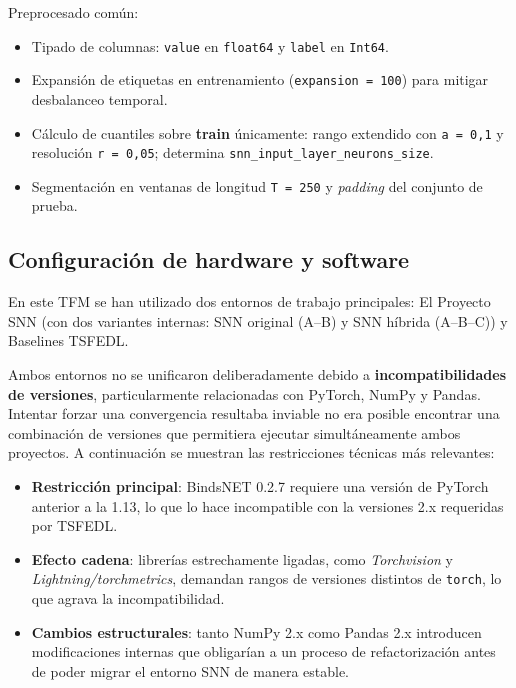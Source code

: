 Preprocesado común:
\begin{itemize}
    \item Tipado de columnas: \texttt{value} en \texttt{float64} y \texttt{label} en \texttt{Int64}.
    \item Expansión de etiquetas en entrenamiento (\texttt{expansion = 100}) para mitigar desbalanceo temporal.
    \item Cálculo de cuantiles sobre \textbf{train} únicamente: rango extendido con \texttt{a = 0{,}1} y resolución \texttt{r = 0{,}05}; determina \texttt{snn\_input\_layer\_neurons\_size}.
    \item Segmentación en ventanas de longitud \texttt{T = 250} y \textit{padding} del conjunto de prueba.
\end{itemize}

\subsection{Configuración de hardware y software}
\label{subsec:config_hw_sw}

En este TFM se han utilizado dos entornos de trabajo principales:  El Proyecto SNN (con dos variantes internas: SNN original (A–B) y SNN híbrida (A–B–C)) y Baselines TSFEDL.

Ambos entornos no se unificaron deliberadamente debido a \textbf{incompatibilidades de versiones}, particularmente relacionadas con PyTorch, NumPy y Pandas. Intentar forzar una convergencia resultaba inviable no era posible encontrar una combinación de versiones que permitiera ejecutar simultáneamente ambos proyectos. A continuación se muestran las restricciones técnicas más relevantes:

\begin{itemize}
    \item \textbf{Restricción principal}: BindsNET 0.2.7 requiere una versión de PyTorch anterior a la 1.13, lo que lo hace incompatible con la versiones 2.x requeridas por TSFEDL.
    \item \textbf{Efecto cadena}: librerías estrechamente ligadas, como \textit{Torchvision} y \textit{Lightning/torchmetrics}, demandan rangos de versiones distintos de \texttt{torch}, lo que agrava la incompatibilidad.
    \item \textbf{Cambios estructurales}: tanto NumPy 2.x como Pandas 2.x introducen modificaciones internas que obligarían a un proceso de refactorización antes de poder migrar el entorno SNN de manera estable.
\end{itemize}

